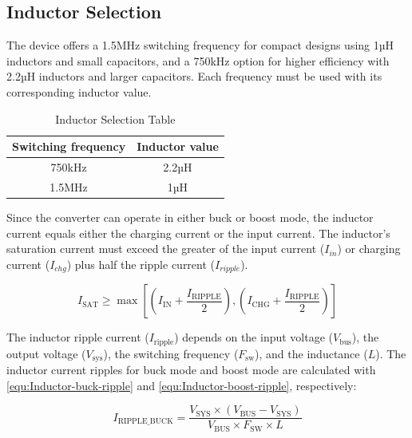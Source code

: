 \documentclass[12pt]{article}
\begin{document}
\subsection{Inductor Selection}
The device offers a 1.5MHz switching frequency for compact designs using 1µH inductors and small capacitors, and a 750kHz option for higher efficiency with 2.2µH inductors and larger capacitors. Each frequency must be used with its corresponding inductor value. 

\begin{table}[H]
    \centering
    \begin{tabular}{|c|c|}
        \hline
        \rowcolor{headerbg}
        \textcolor{headerfg}{\textbf{Switching frequency}} &
        \textcolor{headerfg}{\textbf{Inductor value}} \\
        \hline
        750kHz & 2.2µH \\
        1.5MHz & 1µH \\
        \hline
    \end{tabular}
    \caption{Inductor Selection Table}
    \label{tab:Inductor-Selection}
\end{table}

Since the converter can operate in either buck or boost mode, the inductor current equals either the charging current or the input current. The inductor's saturation current must exceed the greater of the input current ($I_{in}$) or charging current ($I_{chg}$) plus half the ripple current ($I_{ripple}$).

\begin{equation}
I_{\text{SAT}} \geq \max \left[ \left( I_{\text{IN}} + \frac{I_{\text{RIPPLE}}}{2} \right), \left( I_{\text{CHG}} + \frac{I_{\text{RIPPLE}}}{2} \right) \right]
    \label{equ:Inductor-Selection}
\end{equation}

The inductor ripple current ($I_{\text{ripple}}$) depends on the input voltage ($V_{\text{bus}}$), the output voltage ($V_{\text{sys}}$), the switching frequency ($F_{\text{sw}}$), and the inductance ($L$). The inductor current ripples for buck mode and boost mode are calculated with \autoref{equ:Inductor-buck-ripple} and \autoref{equ:Inductor-boost-ripple}, respectively:


\begin{equation}
I_{\text{RIPPLE\_BUCK}} = \frac{V_{\text{SYS}} \times (V_{\text{BUS}} - V_{\text{SYS}})}{V_{\text{BUS}} \times F_{\text{SW}} \times L}
\label{equ:Inductor-buck-ripple}
\end{equation}
\end{document}

